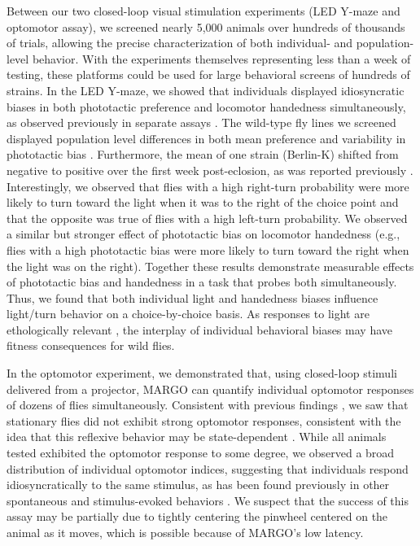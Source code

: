 \documentclass[12pt,letterpaper]{article}
\begin{document}
Between our two closed-loop visual stimulation experiments (LED Y-maze and optomotor assay), we screened nearly 5,000 animals over hundreds of thousands of trials, allowing the precise characterization of both individual- and population-level behavior. With the experiments themselves representing less than a week of testing, these platforms could be used for large behavioral screens of hundreds of strains. In the LED Y-maze, we showed that individuals displayed idiosyncratic biases in both phototactic preference and locomotor handedness simultaneously, as observed previously in separate assays \cite{Kain_Phototactic_2012,Buchanan_Neuronal_2015}. The wild-type fly lines we screened displayed population level differences in both mean preference and variability in phototactic bias \cite{Ayroles_Behavioral_2015}. Furthermore, the mean of one strain (Berlin-K) shifted from negative to positive over the first week post-eclosion, as was reported previously \cite{Chiang_Tactic_1963}. Interestingly, we observed that flies with a high right-turn probability were more likely to turn toward the light when it was to the right of the choice point and that the opposite was true of flies with a high left-turn probability. We observed a similar but stronger effect of phototactic bias on locomotor handedness (e.g., flies with a high phototactic bias were more likely to turn toward the right when the light was on the right). Together these results demonstrate measurable effects of phototactic bias and handedness in a task that probes both simultaneously. Thus, we found that both individual light and handedness biases influence light/turn behavior on a choice-by-choice basis. As responses to light are ethologically relevant \cite{Kain_Variability_2015}, the interplay of individual behavioral biases may have fitness consequences for wild flies.

In the optomotor experiment, we demonstrated that, using closed-loop stimuli delivered from a projector, MARGO can quantify individual optomotor responses of dozens of flies simultaneously. Consistent with previous findings \cite{Zhu_Peripheral_2009,Kim_Fly_2016}, we saw that stationary flies did not exhibit strong optomotor responses, consistent with the idea that this reflexive behavior may be state-dependent \cite{Rosner_Behavioural_2009, Rien_Octopaminergic_2013, Chiappe_Walking_2010, Maimon_Active_2010,gorostiza_2018}. While all animals tested exhibited the optomotor response to some degree, we observed a broad distribution of individual optomotor indices, suggesting that individuals respond idiosyncratically to the same stimulus, as has been found previously in other spontaneous and stimulus-evoked behaviors \cite{Kain_Phototactic_2012,Kain_Leg_2013,Kain_Variability_2015,Buchanan_Neuronal_2015,Todd_Systematic_2017}. We suspect that the success of this assay may be partially due to tightly centering the pinwheel centered on the animal as it moves, which is possible because of MARGO's low latency.
\end{document}

